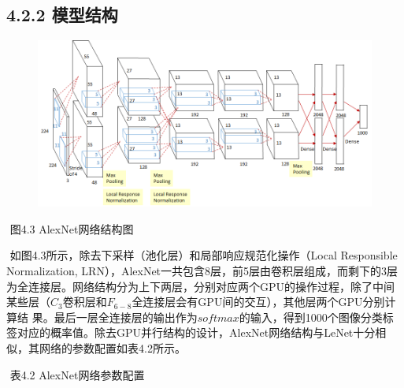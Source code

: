 \subsection{4.2.2 模型结构}\label{ux6a21ux578bux7ed3ux6784-1}

\begin{figure}
\centering
\includegraphics{./img/ch4/alexnet.png}
\caption{}
\end{figure}

​ 图4.3 AlexNet网络结构图

​ 如图4.3所示，除去下采样（池化层）和局部响应规范化操作（Local
Responsible Normalization,
LRN），AlexNet一共包含8层，前5层由卷积层组成，而剩下的3层为全连接层。网络结构分为上下两层，分别对应两个GPU的操作过程，除了中间某些层（\(C_3\)卷积层和\(F_{6-8}\)全连接层会有GPU间的交互），其他层两个GPU分别计算结
果。最后一层全连接层的输出作为\(softmax\)的输入，得到1000个图像分类标签对应的概率值。除去GPU并行结构的设计，AlexNet网络结构与LeNet十分相似，其网络的参数配置如表4.2所示。

​ 表4.2 AlexNet网络参数配置

